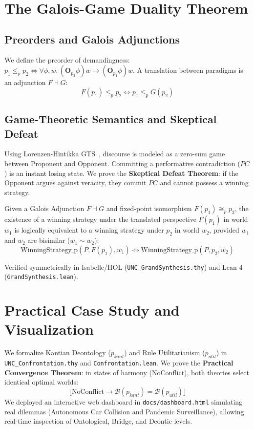 \documentclass[runningheads]{llncs}
\begin{document}
\section{The Galois-Game Duality Theorem}

\subsection{Preorders and Galois Adjunctions}
We define the preorder of demandingness: $p_1 \le_p p_2 \iff \forall \phi, w.\, (\mathbf{O}_{p_2} \phi) w \longrightarrow (\mathbf{O}_{p_1} \phi) w$. A translation between paradigms is an adjunction $F \dashv G$:
\[
F(p_1) \le_p p_2 \iff p_1 \le_p G(p_2)
\]

\subsection{Game-Theoretic Semantics and Skeptical Defeat}
Using Lorenzen-Hintikka GTS~\cite{lorenzen1978dialogische}, discourse is modeled as a zero-sum game between Proponent and Opponent. Committing a performative contradiction ($PC$) is an instant losing state. We prove the \textbf{Skeptical Defeat Theorem}: if the Opponent argues against veracity, they commit $PC$ and cannot possess a winning strategy.

\begin{theorem}
Given a Galois Adjunction $F \dashv G$ and fixed-point isomorphism $F(p_1) \cong_p p_2$, the existence of a winning strategy under the translated perspective $F(p_1)$ in world $w_1$ is logically equivalent to a winning strategy under $p_2$ in world $w_2$, provided $w_1$ and $w_2$ are bisimilar ($w_1 \sim w_2$):
\[
\text{WinningStrategy\_p}(P, F(p_1), w_1) \iff \text{WinningStrategy\_p}(P, p_2, w_2)
\]
\end{theorem}
Verified symmetrically in Isabelle/HOL (\texttt{UNC\_GrandSynthesis.thy}) and Lean 4 (\texttt{GrandSynthesis.lean}).

\section{Practical Case Study and Visualization}

We formalize Kantian Deontology ($p_{kant}$) and Rule Utilitarianism ($p_{util}$) in \texttt{UNC\_Confrontation.thy} and \texttt{Confrontation.lean}. We prove the \textbf{Practical Convergence Theorem}: in states of harmony ($\text{NoConflict}$), both theories select identical optimal worlds:
\[
\lfloor \text{NoConflict} \rightarrow \mathcal{B}(p_{kant}) = \mathcal{B}(p_{util}) \rfloor
\]
We deployed an interactive web dashboard in \texttt{docs/dashboard.html} simulating real dilemmas (Autonomous Car Collision and Pandemic Surveillance), allowing real-time inspection of Ontological, Bridge, and Deontic levels.
\end{document}
